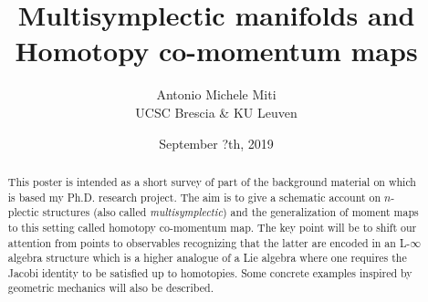\documentclass[11pt,a4paper,twoside]{article}
\begin{document}
\title{Multisymplectic manifolds and Homotopy co-momentum maps}
\author{Antonio Michele Miti\\ UCSC Brescia \& KU Leuven}

\date{September ?th, 2019}
\maketitle


\begin{abstract}

This poster is intended as a short survey of part of the background material on which is based my Ph.D. research project.
The aim is to give a schematic account on $n$-plectic structures (also called \emph{multisymplectic})  and the generalization of moment maps to this setting called homotopy co-momentum map.
The key point will be to shift our attention from points to observables recognizing that the latter are encoded in an L-$\infty$ algebra structure which is a higher analogue of a Lie algebra where one requires the Jacobi identity to be satisfied up to homotopies.
Some concrete examples inspired by geometric mechanics will also be described.
 
\end{abstract}




			
			
\end{document}
